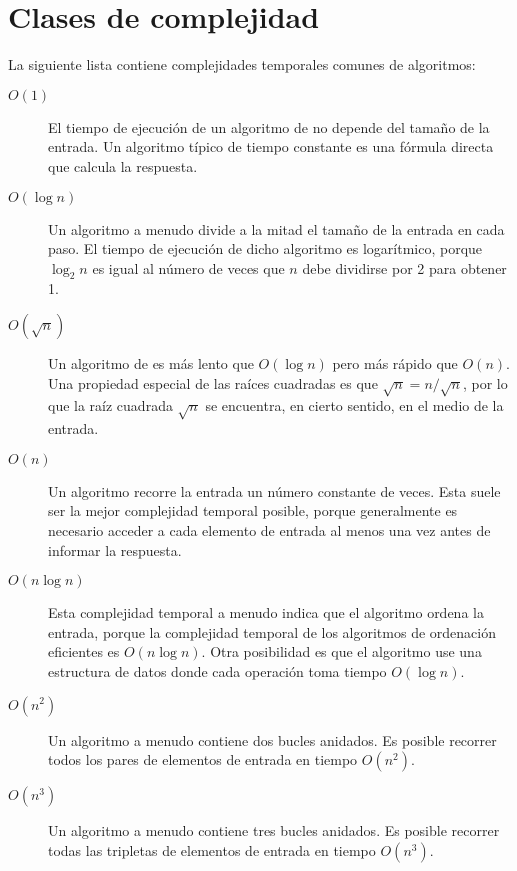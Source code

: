 \section{Clases de complejidad}


La siguiente lista contiene complejidades temporales comunes
de algoritmos:

\begin{description}
\item[$O(1)$]
El tiempo de ejecución de un algoritmo de 
no depende del tamaño de la entrada.
Un algoritmo típico de tiempo constante es una fórmula directa
que calcula la respuesta.

\item[$O(\log n)$]
Un algoritmo  a menudo divide a la mitad
el tamaño de la entrada en cada paso.
El tiempo de ejecución de dicho algoritmo
es logarítmico, porque
$\log_2 n$ es igual al número de veces
que $n$ debe dividirse por 2 para obtener 1.

\item[$O(\sqrt n)$]
Un algoritmo de  es más lento que
$O(\log n)$ pero más rápido que $O(n)$.
Una propiedad especial de las raíces cuadradas es que
$\sqrt n = n/\sqrt n$, por lo que la raíz cuadrada $\sqrt n$ se encuentra,
en cierto sentido, en el medio de la entrada.

\item[$O(n)$]
Un algoritmo  recorre la entrada
un número constante de veces.
Esta suele ser la mejor complejidad temporal posible,
porque generalmente es necesario acceder a cada
elemento de entrada al menos una vez antes de
informar la respuesta.

\item[$O(n \log n)$]
Esta complejidad temporal a menudo indica que
el algoritmo ordena la entrada,
porque la complejidad temporal de los algoritmos de ordenación eficientes es $O(n \log n)$.
Otra posibilidad es que el algoritmo
use una estructura de datos donde cada operación
toma tiempo $O(\log n)$.

\item[$O(n^2)$]
Un algoritmo  a menudo contiene
dos bucles anidados.
Es posible recorrer todos los pares de
elementos de entrada en tiempo $O(n^2)$.

\item[$O(n^3)$]
Un algoritmo  a menudo contiene
tres bucles anidados.
Es posible recorrer todas las tripletas de
elementos de entrada en tiempo $O(n^3)$.


\end{description}
